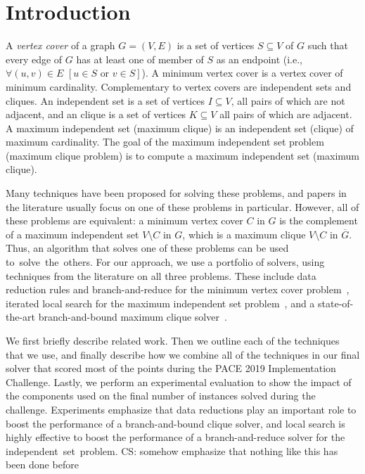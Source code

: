 \documentclass[twoside,leqno,twocolumn]{article}
\newcommand{\csch}[1]{{\color{red} CS: #1}}
\begin{document}
\section{Introduction}

A \emph{vertex cover} of a graph $G=(V,E)$ is a set of vertices $S\subseteq V$ of $G$ such that every edge of $G$ has at least one of member of $S$ as an endpoint (i.e., $\forall (u,v) \in E\,\, [u\in S \textrm{ or } v \in S]$).
A minimum vertex cover is a vertex cover of minimum cardinality. 
Complementary to vertex covers are independent sets and cliques. An independent set is a set of vertices $I\subseteq V$, all pairs of which are not adjacent, and an clique is a set of vertices $K\subseteq V$ all pairs of which are adjacent. A maximum independent set (maximum clique) is an independent set (clique) of maximum cardinality. The goal of the maximum independent set problem (maximum clique problem) is to compute a maximum independent set (maximum clique).

Many techniques have been proposed for solving these problems, and papers in the literature usually focus on one of these problems in particular. However, all of these problems are equivalent: a
minimum vertex cover $C$ in $G$ is the complement of a maximum independent set $V\setminus C$ in $G$, which is a maximum clique $V\setminus C$ in $\overline{G}$. Thus, an algorithm that solves one of these problems can be used to~solve~the~others.
For our approach, we use a portfolio of solvers, using techniques from the literature on all three problems. These include data reduction rules and branch-and-reduce for the minimum vertex cover problem~\cite{akiba-tcs-2016}, iterated local search for the maximum independent set problem~\cite{andrade-2012}, and a state-of-the-art branch-and-bound maximum clique solver~\cite{DBLP:journals/cor/LiJM17}.

We first briefly describe related work. Then we outline each of the techniques that we use, and finally describe how we combine all of the techniques in our final solver that scored most of the points during the PACE 2019 Implementation Challenge. Lastly, we perform an experimental evaluation to show the impact of the components used on the final number of instances solved during the challenge.
Experiments emphasize that data reductions play an important role to boost the
performance of a branch-and-bound clique solver, and local search is highly
effective to boost the performance of a branch-and-reduce solver for the
independent~set~problem. \csch{somehow emphasize that nothing like this has been
  done before}
\end{document}
